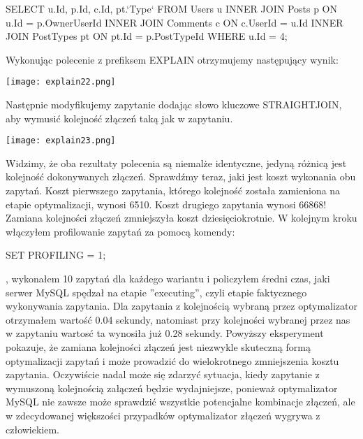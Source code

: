 \begin{spverbatim}
	SELECT u.Id, p.Id, c.Id, pt.`Type` FROM Users u INNER JOIN Posts p ON u.Id = p.OwnerUserId	INNER JOIN Comments c ON c.UserId = u.Id INNER JOIN PostTypes pt ON pt.Id = p.PostTypeId WHERE u.Id = 4;
\end{spverbatim}

Wykonując polecenie z prefiksem EXPLAIN otrzymujemy następujący wynik:
\begin{center}
	\texttt{[image: explain22.png]} 
\end{center}
Następnie modyfikujemy zapytanie dodając słowo kluczowe STRAIGHT\textunderscore JOIN, aby wymusić kolejność złączeń taką jak w zapytaniu.
\begin{center}
	\texttt{[image: explain23.png]} 
\end{center}
Widzimy, że oba rezultaty polecenia są niemalże identyczne, jedyną różnicą jest kolejność dokonywanych złączeń. Sprawdźmy teraz, jaki jest koszt wykonania obu zapytań. Koszt pierwszego zapytania, którego kolejność została zamieniona na etapie optymalizacji, wynosi 6510. Koszt drugiego zapytania wynosi 66868! Zamiana kolejności złączeń zmniejszyła koszt dziesięciokrotnie.
W kolejnym kroku włączyłem profilowanie zapytań za pomocą komendy:
\begin{spverbatim}
	SET PROFILING = 1;
\end{spverbatim}, wykonałem 10 zapytań dla każdego wariantu i policzyłem średni czas, jaki serwer MySQL spędzał na etapie ''executing'', czyli etapie faktycznego wykonywania zapytania. Dla zapytania z kolejnością wybraną przez optymalizator otrzymałem wartość 0.04 sekundy, natomiast przy kolejności wybranej przez nas w zapytaniu wartosć ta wynosiła już 0.28 sekundy. Powyższy eksperyment pokazuje, że zamiana kolejności złączeń jest niezwykle skuteczną formą optymalizacji zapytań i może prowadzić do wielokrotnego zmniejszenia kosztu zapytania. Oczywiście nadal może się zdarzyć sytuacja, kiedy zapytanie z wymuszoną kolejnością załączeń będzie wydajniejsze, ponieważ optymalizator MySQL nie zawsze może sprawdzić wszystkie potencjalne kombinacje złączeń, ale w zdecydowanej większości przypadków optymalizator złączeń wygrywa z człowiekiem.

